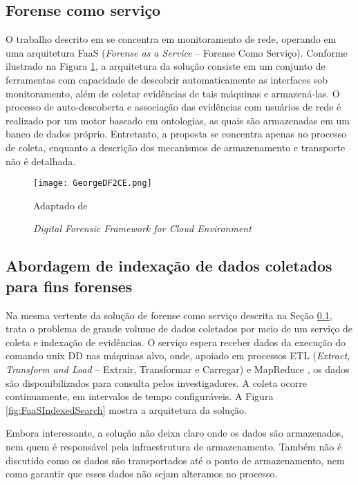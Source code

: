 \subsection{Forense como serviço}
\label{sec:frost}

O trabalho descrito em \cite{GeorgeDF2CE:2012} se concentra em monitoramento de rede, operando em uma arquitetura FaaS (\textit{Forense as a Service} -- Forense Como Serviço). 
%
Conforme ilustrado na Figura \ref{fig:GeorgeDF2CE}, a arquitetura da solução consiste em um conjunto de ferramentas com capacidade de descobrir automaticamente as interfaces sob monitoramento, além de coletar evidências de tais máquinas e armazená-las.
%
O processo de auto-descoberta e associação das evidências com usuários de rede é realizado por um motor baseado em ontologias, as quais são armazenadas em um banco de dados próprio.
%
Entretanto, a proposta se concentra apenas no processo de coleta, enquanto a descrição dos mecanismos de armazenamento e transporte não é detalhada.


\begin{figure}[htb!]
\footnotesize
\caption{\textit{Digital Forensic Framework for Cloud Environment}}
\texttt{[image: GeorgeDF2CE.png]}
\centering
\label{fig:GeorgeDF2CE}
\begin{center}
Adaptado de \cite{GeorgeDF2CE:2012} 
\end{center}
\end{figure}


\subsection{Abordagem de indexação de dados coletados para fins forenses}
\label{sec:indexacaoforense}

Na mesma vertente da solução de forense como serviço descrita na Seção \ref{sec:frost}, \cite{FaaSIndexedSearch:2012} trata o problema de grande volume de dados coletados por meio de um serviço de coleta e indexação de evidências.
%
O serviço espera receber dados da execução do comando unix DD \cite{UnixManPagesDD} nas máquinas alvo, onde, apoiado em processos ETL (\textit{Extract, Transform and Load} -- Extrair, Transformar e Carregar) e MapReduce \cite{WikipediaMapReduce}, os dados são disponibilizados para consulta pelos investigadores.
%
A coleta ocorre continuamente, em intervalos de tempo configuráveis.
%
A Figura \ref{fig:FaaSIndexedSearch} mostra a arquitetura da solução.


Embora interessante, a solução não deixa claro onde os dados são armazenados, nem quem é responsável pela infraestrutura de armazenamento.
%
Também não é discutido como os dados são transportados até o ponto de armazenamento, nem como garantir que esses dados não sejam alteramos no processo.
%


